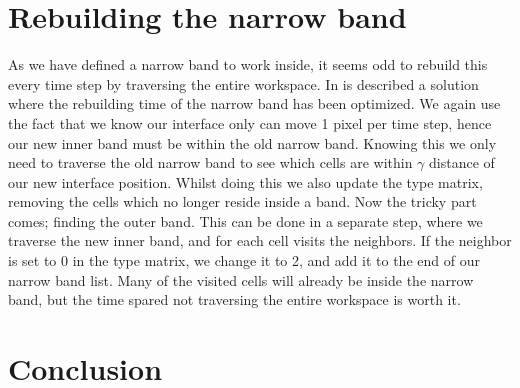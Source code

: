 \section{Rebuilding the narrow band}
As we have defined a narrow band to work inside, it seems odd to
rebuild this every time step by traversing the entire
workspace. In  is described a solution where the
rebuilding time of the narrow band has been optimized. We again use
the fact that we know our interface only can move 1 pixel per time step,
hence our new inner band must be within the old narrow band. Knowing
this we only need to traverse the old narrow band to see which cells
are within $\gamma$ distance of our new interface position. Whilst
doing this we also update the type matrix, removing the cells which no
longer reside inside a band. Now the tricky part comes; finding the
outer band. This can be done in a separate step, where we traverse the
new inner band, and for each cell visits the neighbors. If the
neighbor is set to 0 in the type matrix, we change it to 2, and add it
to the end of our narrow band list. Many of the visited cells will
already be inside the narrow band, but the time spared not traversing
the entire workspace is worth it. 





\section{Conclusion}

